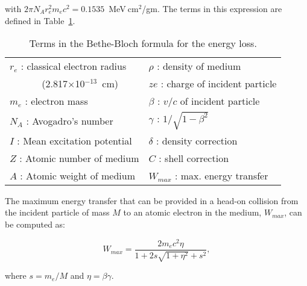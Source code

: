\noindent
with $2 \pi N_A r_e^2 m_e c^2 = 0.1535$~MeV$~\!$cm$^2$/gm. The terms in this expression are defined in Table~\ref{tab.3.1}.

\begin{table}[htbp]
    \begin{center}
        \begin{tabular} {||l||l||} \hline
            $r_e$ : classical electron radius   & $\rho$ : density of medium \\
            ~~~~~~ (2.817$\times$10$^{-13}$~cm) & $ze$ : charge of incident particle \\
            $m_e$ : electron mass               & $\beta$ : $v/c$ of incident particle \\
            $N_A$ : Avogadro's number           & $\gamma$ : $1/\sqrt{1 - \beta^2}$ \\
            $I$  : Mean excitation potential    & $\delta$ : density correction \\
            $Z$ : Atomic number of medium       & $C$ : shell correction \\
            $A$ : Atomic weight of medium       & $W_{max}$ : max. energy transfer \\ \hline
        \end{tabular}
    \end{center}
    \caption{\small{Terms in the Bethe-Bloch formula for the energy loss.}}
    \label{tab.3.1}
\end{table}

The maximum energy transfer that can be provided in a head-on collision from the incident particle of mass $M$ to an atomic electron in the medium, $W_{max}$, can be computed as:

\begin{equation}
    \label{eq.3.2}
    W_{max} = \frac{2 m_e c^2 \eta}{1 + 2 s \sqrt{1 + \eta^2} + s^2},
\end{equation}

\noindent
where $s = m_e/M$ and $\eta = \beta \gamma$.

